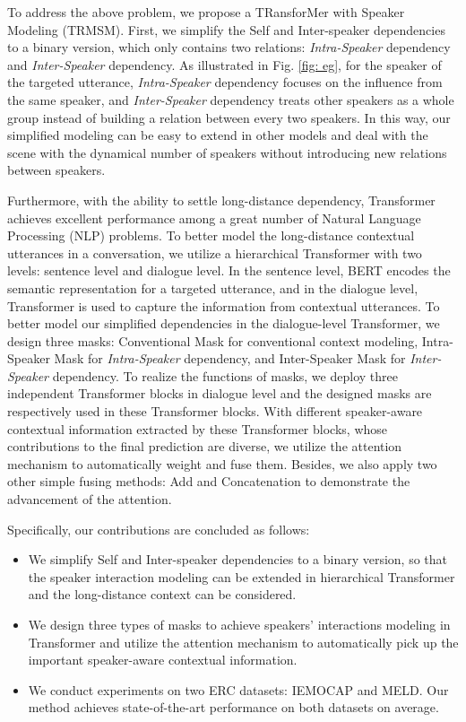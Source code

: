\documentclass[letterpaper]{article} \usepackage{aaai21}  \usepackage{times}  \usepackage{helvet} \usepackage{courier}  \usepackage[hyphens]{url}  \usepackage{graphicx} \urlstyle{rm} \def\UrlFont{\rm}  \usepackage{natbib}  \usepackage{caption} \usepackage{multirow}
\begin{document}
To address the above problem, we propose a TRansforMer with Speaker Modeling (TRMSM). First, we simplify the Self and Inter-speaker dependencies to a binary version, which only contains two relations: \emph{Intra-Speaker} dependency and \emph{Inter-Speaker} dependency. As illustrated in Fig. \ref{fig: eg}, for the speaker of the targeted utterance, \emph{Intra-Speaker} dependency focuses on the influence from the same speaker, and \emph{Inter-Speaker} dependency treats other speakers as a whole group instead of building a relation between every two speakers. In this way, our simplified modeling can be easy to extend in other models and deal with the scene with the dynamical number of speakers without introducing new relations between speakers. 

Furthermore, with the ability to settle long-distance dependency, Transformer \citep{Transformer} achieves excellent performance among a great number of Natural Language Processing (NLP) problems. To better model the long-distance contextual utterances in a conversation, we utilize a hierarchical Transformer with two levels: sentence level and dialogue level. In the sentence level, BERT \citep{BERT} encodes the semantic representation for a targeted utterance, and in the dialogue level, Transformer is used to capture the information from contextual utterances. To better model our simplified dependencies in the dialogue-level Transformer, we design three masks: Conventional Mask for conventional context modeling, Intra-Speaker Mask for \emph{Intra-Speaker} dependency, and Inter-Speaker Mask for \emph{Inter-Speaker} dependency. To realize the functions of masks, we deploy three independent Transformer blocks in dialogue level and the designed masks are respectively used in these Transformer blocks. With different speaker-aware contextual information extracted by these Transformer blocks, whose contributions to the final prediction are diverse, we utilize the attention mechanism to automatically weight and fuse them. Besides, we also apply two other simple fusing methods: Add and Concatenation to demonstrate the advancement of the attention. 

Specifically, our contributions are concluded as follows:

\begin{itemize}
\item We simplify Self and Inter-speaker dependencies to a binary version, so that the speaker interaction modeling can be extended in hierarchical Transformer and the long-distance context can be considered. 
\item We design three types of masks to achieve speakers' interactions modeling in Transformer and utilize the attention mechanism to automatically pick up the important speaker-aware contextual information. 
\item We conduct experiments on two ERC datasets: IEMOCAP and MELD. Our method achieves state-of-the-art performance on both datasets on average. 
\end{itemize}
\end{document}
